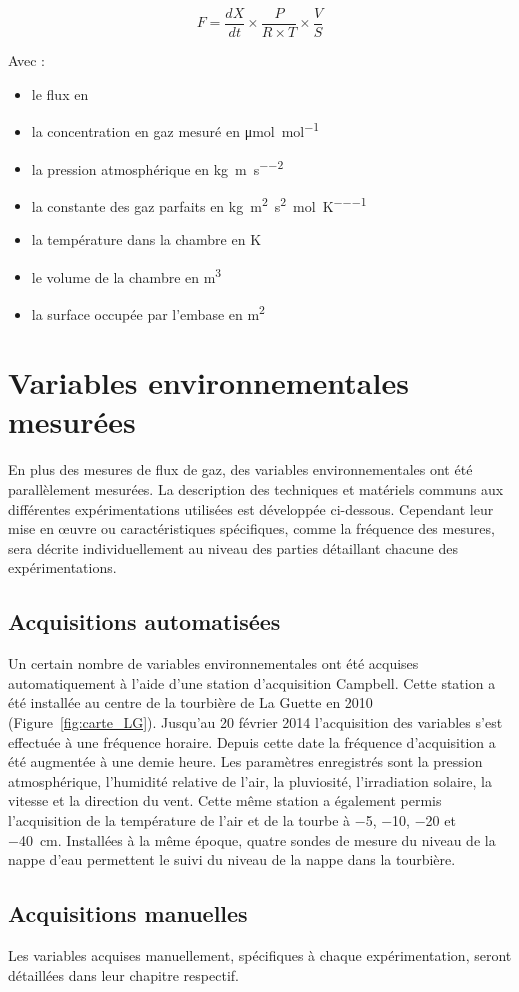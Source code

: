 \begin{equation}
F = \frac{dX}{dt} \times \frac{P}{R \times T} \times \frac{V}{S}
\end{equation}

Avec : 
\begin{itemize}
\item[F :] le flux en \si{\uml}
\item[X :] la concentration en gaz mesuré en \si{\micro\mole\per\mole}
\item[P :] la pression atmosphérique en \si{\kilo\gram\per\metre\per\square\second}
\item[R :] la constante des gaz parfaits en \si{\kilo\gram\square\metre\per\square\second\per\mole\per\kelvin}
\item[T :] la température dans la chambre en \si{\kelvin}
\item[V :] le volume de la chambre en \si{\cubic\metre}
\item[S :] la surface occupée par l'embase en \si{\square\metre}
\end{itemize}

\section{Variables environnementales mesurées}
En plus des mesures de flux de gaz, des variables environnementales ont été parallèlement mesurées.
La description des techniques et matériels communs aux différentes expérimentations utilisées est développée ci-dessous.
Cependant leur mise en œuvre ou caractéristiques spécifiques, comme la fréquence des mesures, sera décrite individuellement au niveau des parties détaillant chacune des expérimentations.

\subsection{Acquisitions automatisées}

Un certain nombre de variables environnementales ont été acquises automatiquement à l'aide d'une station d'acquisition Campbell\textsuperscript{\textregistered}.
Cette station a été installée au centre de la tourbière de La Guette en 2010 (Figure~\ref{fig:carte_LG}).
Jusqu'au 20 février 2014 l'acquisition des variables s'est effectuée à une fréquence horaire.
Depuis cette date la fréquence d'acquisition a été augmentée à une demie heure.
Les paramètres enregistrés sont la pression atmosphérique, l'humidité relative de l'air, la pluviosité, l'irradiation solaire, la vitesse et la direction du vent. 
Cette même station a également permis l'acquisition de la température de l'air et de la tourbe à \num{-5}, \num{-10}, \num{-20} et \SIlist{-40}{\cm}.
Installées à la même époque, quatre sondes de mesure du niveau de la nappe d'eau permettent le suivi du niveau de la nappe dans la tourbière.

\subsection{Acquisitions manuelles}

Les variables acquises manuellement, spécifiques à chaque expérimentation, seront détaillées dans leur chapitre respectif.
